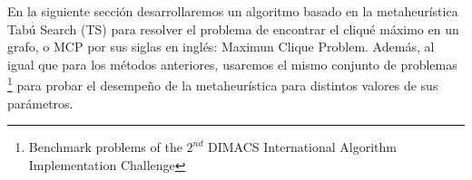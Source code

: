 En la siguiente sección desarrollaremos un algoritmo basado en la metaheurística Tabú Search (TS) para resolver el problema de encontrar el cliqué máximo en un grafo, o MCP por sus siglas en inglés: Maximun Clique Problem. Además, al igual que para los métodos anteriores, usaremos el mismo conjunto de problemas \footnote{Benchmark problems of the $2^{nd}$ DIMACS International Algorithm Implementation Challenge} para probar el desempeño de la metaheurística para distintos valores de sus parámetros.